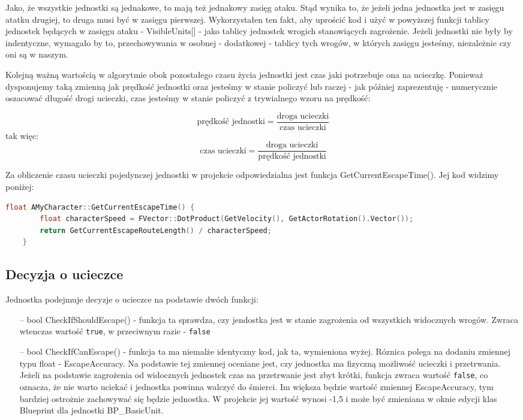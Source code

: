 \documentclass[12pt]{report}
\begin{document}
Jako, że wszystkie jednostki są jednakowe, to mają też jednakowy zasięg ataku. Stąd wynika to, że jeżeli jedna jednostka jest w zasięgu atatku drugiej, to druga musi być w zasięgu pierwszej. Wykorzystałen ten fakt, aby uprościć kod i użyć w powyższej funkcji tablicy jednostek będących w zasięgu ataku - VisibleUnits[] - jako tablicy jednostek wrogich stanowiących zagrożenie. Jeżeli jednostki nie były by indentyczne, wymagało by to, przechowywania w osobnej - dodatkowej - tablicy tych wrogów, w których zasięgu jesteśmy, niezależnie czy oni są w naszym.

Kolejną ważną wartością w algorytmie obok pozostałego czasu życia jednostki jest czas jaki potrzebuje ona na ucieczkę. Ponieważ dysponujemy taką zmienną jak prędkość jednostki oraz jesteśmy w stanie policzyć lub raczej - jak później zaprezentuję - numerycznie oszacować długość drogi ucieczki, czas jesteśmy w stanie policzyć z trywialnego wzoru na prędkość:

\[ \text{prędkość jednostki} =  \dfrac{\text{droga ucieczki}}{\text{czas ucieczki}}  \]
tak więc:
\[ {\text{czas ucieczki}} =  \dfrac{\text{droga ucieczki}}{\text{prędkość jednostki}}  \]


Za obliczenie czasu ucieczki pojedynczej jednostki w projekcie odpowiedzialna jest funkcja GetCurrentEscapeTime(). Jej kod widzimy poniżej: 

\begin{lstlisting}[language=C++, backgroundcolor=\color{black!5}, basicstyle=\footnotesize, caption=Funkcja GetCurrentEscapeTime w klasie \texttt{AMyCharacter.cpp}.]
	float AMyCharacter::GetCurrentEscapeTime() {
		float characterSpeed = FVector::DotProduct(GetVelocity(), GetActorRotation().Vector());
		return GetCurrentEscapeRouteLength() / characterSpeed;
	}
\end{lstlisting}

\subsection{Decyzja o ucieczce}

Jednostka podejmuje decyzje o ucieczce na podstawie dwóch funkcji: 
\begin{itemize}
\item[--] bool CheckIfShouldEscape() - funkcja ta sprawdza, czy jendostka jest w stanie zagrożenia od wszystkich widocznych wrogów. Zwraca wtenczas wartość \texttt{true}, w przeciwnym razie - \texttt{false}
\item[--] bool CheckIfCanEscape() - funkcja ta ma niemalże identyczny kod, jak ta, wymieniona wyżej. Róznica polega na dodaniu zmiennej typu float - EscapeAccuracy. Na podstawie tej zmiennej oceniane jest, czy jednostka ma fizyczną możliwość ucieczki i przetrwania. Jeżeli na podstawie zagrożenia od widocznych jednostek czas na przetrwanie jest zbyt krótki, funkcja zwraca wartość \texttt{false}, co oznacza, że nie warto uciekać i jednostka powinna walczyć do śmierci. Im większa będzie wartość zmiennej EscapeAccuracy, tym bardziej ostrożnie zachowywać się będzie jednostka. W projekcie jej wartość wynosi -1,5 i może być zmieniana w oknie edycji klas Blueprint dla jednostki BP\_BasicUnit.
\end{itemize}
\end{document}
